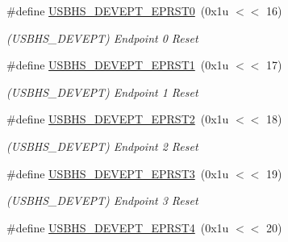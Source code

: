 \begin{DoxyCompactItemize}
\mbox{\label{group__SAMV71__USBHS_gaa1dded3e04fd3b1b0bb6974490c7eeb4}} 
\#define \mbox{\hyperlink{group__SAMV71__USBHS_gaa1dded3e04fd3b1b0bb6974490c7eeb4}{U\+S\+B\+H\+S\+\_\+\+D\+E\+V\+E\+P\+T\+\_\+\+E\+P\+R\+S\+T0}}~(0x1u $<$$<$ 16)
\begin{DoxyCompactList}\small\item\em (U\+S\+B\+H\+S\+\_\+\+D\+E\+V\+E\+PT) Endpoint 0 Reset \end{DoxyCompactList}\item 
\mbox{\label{group__SAMV71__USBHS_ga64ccf2f6332cb69a6bcd437af4aa8de8}} 
\#define \mbox{\hyperlink{group__SAMV71__USBHS_ga64ccf2f6332cb69a6bcd437af4aa8de8}{U\+S\+B\+H\+S\+\_\+\+D\+E\+V\+E\+P\+T\+\_\+\+E\+P\+R\+S\+T1}}~(0x1u $<$$<$ 17)
\begin{DoxyCompactList}\small\item\em (U\+S\+B\+H\+S\+\_\+\+D\+E\+V\+E\+PT) Endpoint 1 Reset \end{DoxyCompactList}\item 
\mbox{\label{group__SAMV71__USBHS_gabe64f2436583cfadfcb6f9ea4615a793}} 
\#define \mbox{\hyperlink{group__SAMV71__USBHS_gabe64f2436583cfadfcb6f9ea4615a793}{U\+S\+B\+H\+S\+\_\+\+D\+E\+V\+E\+P\+T\+\_\+\+E\+P\+R\+S\+T2}}~(0x1u $<$$<$ 18)
\begin{DoxyCompactList}\small\item\em (U\+S\+B\+H\+S\+\_\+\+D\+E\+V\+E\+PT) Endpoint 2 Reset \end{DoxyCompactList}\item 
\mbox{\label{group__SAMV71__USBHS_gaa53657d7905f8b1def9da56935a73c87}} 
\#define \mbox{\hyperlink{group__SAMV71__USBHS_gaa53657d7905f8b1def9da56935a73c87}{U\+S\+B\+H\+S\+\_\+\+D\+E\+V\+E\+P\+T\+\_\+\+E\+P\+R\+S\+T3}}~(0x1u $<$$<$ 19)
\begin{DoxyCompactList}\small\item\em (U\+S\+B\+H\+S\+\_\+\+D\+E\+V\+E\+PT) Endpoint 3 Reset \end{DoxyCompactList}\item 
\mbox{\label{group__SAMV71__USBHS_ga9fc2be8154c74313a16be3080dc5e995}} 
\#define \mbox{\hyperlink{group__SAMV71__USBHS_ga9fc2be8154c74313a16be3080dc5e995}{U\+S\+B\+H\+S\+\_\+\+D\+E\+V\+E\+P\+T\+\_\+\+E\+P\+R\+S\+T4}}~(0x1u $<$$<$ 20)
$$
\end{DoxyCompactItemize}
